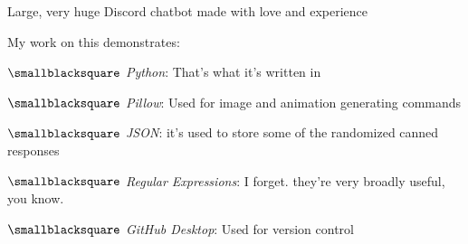 \documentclass[10mm,letterpaper,notitlepage]{article}
\begin{document}
{{								\setlength{\parindent}{\parindent-4mm}
							\par}
							{\color[RGB]{0, 0, 0}
							\fontsize{2.25mm}{3.0mm}\selectfont
									{\color[RGB]{108, 29, 169}
									\fontsize{4.5mm}{6.0mm}\selectfont
									\color[RGB]{99, 94, 183}{{ }}
									\par}
							Large, very huge Discord chatbot made with love and experience
							
							My work on this demonstrates:
								\setlength{\parindent}{\parindent+4mm}
								
								\nopagebreak
								$\smallblacksquare$ \textit{Python}: That's what it's written in
								
								$\smallblacksquare$ \textit{Pillow}: Used for image and animation generating commands
								
								$\smallblacksquare$ \textit{JSON}: it's used to store some of the randomized canned responses
								
								$\smallblacksquare$ \textit{Regular Expressions}: I forget. they're very broadly useful, you know.
								
								$\smallblacksquare$ \textit{GitHub Desktop}: Used for version control
								
}}
\end{document}
